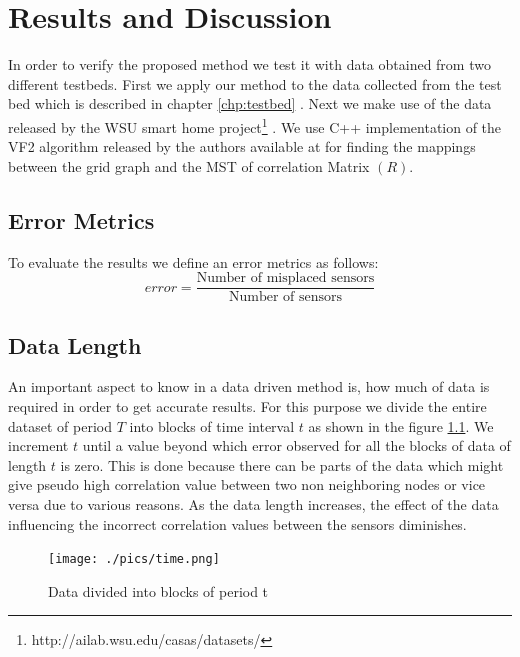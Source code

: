 \chapter{Results and Discussion}
In order to verify the proposed method we test it with data obtained from two different testbeds. First we apply our method to the data collected from the test bed which is described in chapter \ref{chp:testbed} . Next we make use of the data released by the WSU smart home project\footnote{http://ailab.wsu.edu/casas/datasets/} \cite{cook2009assessing}. We use C++ implementation of the VF2 algorithm released by the authors available at \cite{vfLib} for finding the mappings between the grid graph and the MST of correlation Matrix $(R)$.
\section{Error Metrics }
To evaluate the results we define an error metrics as follows:\\
\begin{equation}
error=\frac{\text{Number of misplaced sensors}}{\text{Number of sensors}}
\end{equation}
\section{Data Length}
\label{sec:dataLength}
An important aspect to know in a data driven method is, how much of data is required in order to get accurate results. For this purpose we divide the entire dataset of period $T$ into blocks of time interval $t$ as shown in the figure \ref{fig:time}. We increment $t$ until a value beyond which error observed for all the blocks of data of length $t$ is zero. 
This is done because there can be parts of the data which might give pseudo high correlation value between two non neighboring nodes or vice versa due to various reasons. As the data length increases, the effect of the data influencing the incorrect correlation values between the sensors diminishes.

\begin{figure}[!ht]
\texttt{[image: ./pics/time.png]}
\caption{Data divided into blocks of period t}
\label{fig:time}
\end{figure}

